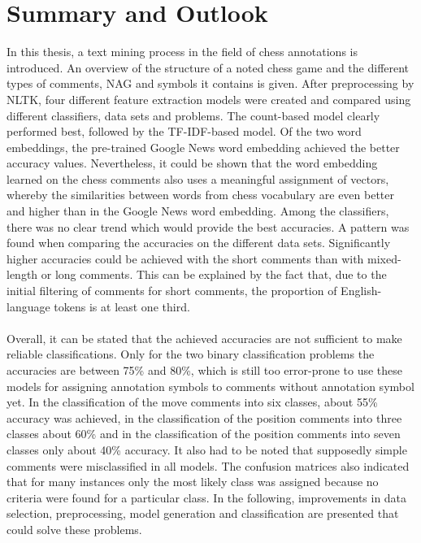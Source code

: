 \documentclass[article,type=msc,colorback,accentcolor=tud7b]{tudthesis}
\begin{document}
  \section{Summary and Outlook}
    In this thesis, a text mining process in the field of chess annotations is introduced. An overview of the structure of a noted chess game and the different types of comments, NAG and symbols it contains is given. After preprocessing by NLTK, four different feature extraction models were created and compared using different classifiers, data sets and problems. The count-based model clearly performed best, followed by the TF-IDF-based model. Of the two word embeddings, the pre-trained Google News word embedding achieved the better accuracy values. Nevertheless, it could be shown that the word embedding learned on the chess comments also uses a meaningful assignment of vectors, whereby the similarities between words from chess vocabulary are even better and higher than in the Google News word embedding. Among the classifiers, there was no clear trend which would provide the best accuracies. A pattern was found when comparing the accuracies on the different data sets. Significantly higher accuracies could be achieved with the short comments than with mixed-length or long comments. This can be explained by the fact that, due to the initial filtering of comments for short comments, the proportion of English-language tokens is at least one third. \\\\
    Overall, it can be stated that the achieved accuracies are not sufficient to make reliable classifications. Only for the two binary classification problems the accuracies are between 75\% and 80\%, which is still too error-prone to use these models for assigning annotation symbols to comments without annotation symbol yet. In the classification of the move comments into six classes, about 55\% accuracy was achieved, in the classification of the position comments into three classes about 60\% and in the classification of the position comments into seven classes only about 40\% accuracy. It also had to be noted that supposedly simple comments were misclassified in all models. The confusion matrices also indicated that for many instances only the most likely class was assigned because no criteria were found for a particular class. In the following, improvements in data selection, preprocessing, model generation and classification are presented that could solve these problems. \\\\
\end{document}
